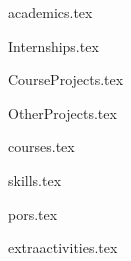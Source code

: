 \documentclass[11pt, a4paper]{awesome-cv}
\newcommand*{\sectiondir}{resume/}
\begin{document}

\vspace*{42mm}

\vspace*{-0.4cm}
{academics.tex}

\vspace*{-0.56cm}
{Internships.tex}

\vspace*{-0.56cm}
{CourseProjects.tex}

\vspace*{-0.56cm}
{OtherProjects.tex}


\vspace*{-0.56cm}
{courses.tex}

\vspace*{-0.56cm}
{skills.tex}

\vspace*{-0.56cm}
{pors.tex}

\vspace*{-0.56cm}
{extraactivities.tex}







\end{document}
